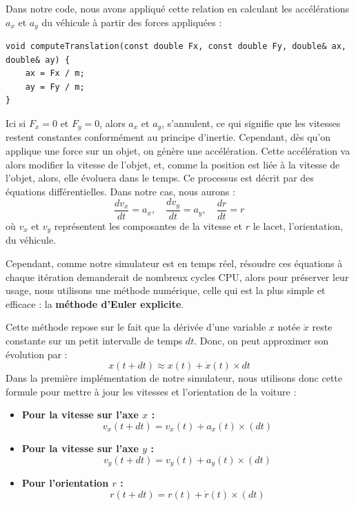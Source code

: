 Dans notre code, nous avons appliqué cette relation en calculant les accélérations $a_x$ et $a_y$ du véhicule à partir des forces appliquées :


\begin{lstlisting}[style=CStyle,label={lst:void_computeTranslation}]
void computeTranslation(const double Fx, const double Fy, double& ax, double& ay) {
    ax = Fx / m;
    ay = Fy / m;
}
\end{lstlisting}

Ici si $F_x = 0$ et $F_y = 0$, alors $a_x$ et $a_y$, s'annulent, ce qui signifie que les vitesses restent constantes conformément au principe d'inertie.
Cependant, dès qu'on applique une force sur un objet, on génère une accélération. Cette accélération va alors modifier la vitesse de l'objet, et, comme la position est liée à la vitesse de l'objet, alors, elle évoluera dans le temps. Ce processus est décrit par des équations différentielles. Dans notre cas, nous aurons :
$$\frac{d v_x}{dt} = a_x, \quad \frac{d v_y}{dt} = a_y, \quad \frac{d r}{dt} = r_{\dot{}}$$
où $v_x$ et $v_y$ représentent les composantes de la vitesse et $r$ le lacet, l'orientation, du véhicule.

Cependant, comme notre simulateur est en temps réel, résoudre ces équations à chaque itération demanderait de nombreux cycles CPU, alors pour préserver leur usage, nous utilisons une méthode numérique, celle qui est la plus simple et efficace : la \textbf{méthode d'Euler explicite}.

Cette méthode repose sur le fait que la dérivée d'une variable $x$ notée $\dot{x}$ reste constante sur un petit intervalle de temps $dt$. Donc, on peut approximer son évolution par :
$$x(t+dt) \approx x(t) + \dot{x}(t) \times dt$$
Dans la première implémentation de notre simulateur, nous utilisons donc cette formule pour mettre à jour les vitesses et l'orientation de la voiture :
\\



\begin{itemize}
    \item \textbf{Pour la vitesse sur l'axe $x$ :}
    $$v_x(t+dt) = v_x(t)+a_x(t)\times(dt)$$
    \item \textbf{Pour la vitesse sur l'axe $y$ :}
    $$v_y(t+dt) = v_y(t)+a_y(t)\times(dt)$$
    \item \textbf{Pour l'orientation $r$ :}
    $$r(t+dt) = r(t)+\dot{r}(t)\times(dt)$$
\end{itemize}

